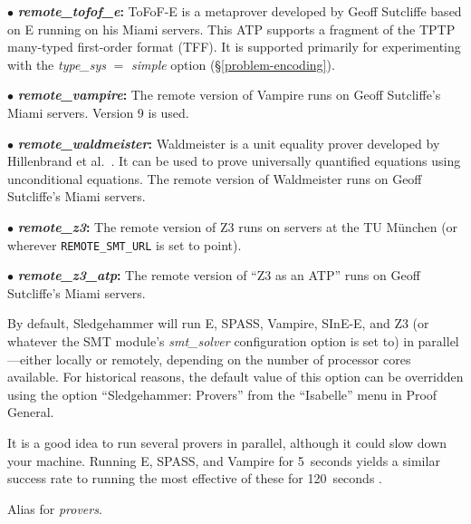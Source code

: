 \documentclass[a4paper,12pt]{article}
\begin{document}
\begin{enum}
\begin{enum}
\item[$\bullet$] \textbf{\textit{remote\_tofof\_e}:} ToFoF-E is a metaprover
developed by Geoff Sutcliffe \cite{tofof} based on E running on his Miami
servers. This ATP supports a fragment of the TPTP many-typed first-order format
(TFF). It is supported primarily for experimenting with the
\textit{type\_sys} $=$ \textit{simple} option (\S\ref{problem-encoding}).

\item[$\bullet$] \textbf{\textit{remote\_vampire}:} The remote version of
Vampire runs on Geoff Sutcliffe's Miami servers. Version 9 is used.

\item[$\bullet$] \textbf{\textit{remote\_waldmeister}:} Waldmeister is a unit
equality prover developed by Hillenbrand et al.\ \cite{waldmeister}. It can be
used to prove universally quantified equations using unconditional equations.
The remote version of Waldmeister runs on Geoff Sutcliffe's Miami servers.

\item[$\bullet$] \textbf{\textit{remote\_z3}:} The remote version of Z3 runs on
servers at the TU M\"unchen (or wherever \texttt{REMOTE\_SMT\_URL} is set to
point).

\item[$\bullet$] \textbf{\textit{remote\_z3\_atp}:} The remote version of ``Z3
as an ATP'' runs on Geoff Sutcliffe's Miami servers.
\end{enum}

By default, Sledgehammer will run E, SPASS, Vampire, SInE-E, and Z3 (or whatever
the SMT module's \textit{smt\_solver} configuration option is set to) in
parallel---either locally or remotely, depending on the number of processor
cores available. For historical reasons, the default value of this option can be
overridden using the option ``Sledgehammer: Provers'' from the ``Isabelle'' menu
in Proof General.

It is a good idea to run several provers in parallel, although it could slow
down your machine. Running E, SPASS, and Vampire for 5~seconds yields a similar
success rate to running the most effective of these for 120~seconds
\cite{boehme-nipkow-2010}.

Alias for \textit{provers}.




\end{enum}
\end{document}
